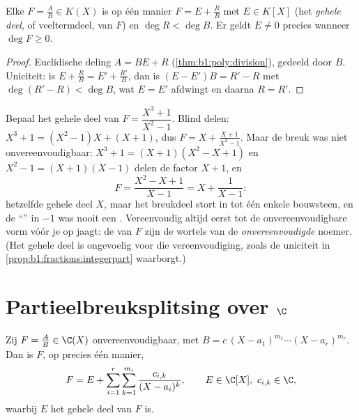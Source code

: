 \begin{proposition}\label{prop:b1:fractions:integerpart}
Elke $F = \frac AB \in K(X)$ is op één manier $F = E + \frac RB$ met $E
\in K[X]$ (het \emph{gehele deel}, of veeltermdeel, van $F$) en $\deg R <
\deg B$. Er geldt $E \neq 0$ precies wanneer $\deg F \geq 0$.
\end{proposition}

\begin{proof}
Euclidische deling $A = BE + R$ (\cref{thm:b1:poly:division}), gedeeld
door $B$. Uniciteit: is $E + \frac RB = E' + \frac{R'}{B}$, dan is $(E -
E')B = R' - R$ met $\deg(R' - R) < \deg B$, wat $E = E'$ afdwingt en
daarna $R = R'$.
\end{proof}

\begin{example}\label{ex:b1:fractions:integerpart}
Bepaal het gehele deel van $F = \dfrac{X^3 + 1}{X^2 - 1}$. Blind delen:
$X^3 + 1 = (X^2 - 1)X + (X + 1)$, dus $F = X + \frac{X + 1}{X^2 - 1}$.
Maar de breuk was niet onvereenvoudigbaar: $X^3 + 1 = (X + 1)(X^2 - X +
1)$ en $X^2 - 1 = (X+1)(X-1)$ delen de factor $X + 1$, en
\[
F = \frac{X^2 - X + 1}{X - 1} = X + \frac{1}{X - 1} :
\]
hetzelfde gehele deel $X$, maar het breukdeel stort in tot één enkele
bouwsteen, en de ``'' in $-1$ was nooit een . Vereenvoudig altijd
eerst tot de onvereenvoudigbare vorm vóór je op  jaagt: de  van
$F$ zijn de wortels van de \emph{onvereenvoudigde} noemer. (Het gehele
deel is ongevoelig voor die vereenvoudiging, zoals de uniciteit in
\cref{prop:b1:fractions:integerpart} waarborgt.)
\end{example}

\section{Partieelbreuksplitsing over $\C$}

\begin{theorem}\label{thm:b1:fractions:complex}
Zij $F = \frac AB \in \C(X)$ onvereenvoudigbaar, met $B = c\,(X -
a_1)^{m_1} \cdots (X - a_r)^{m_r}$. Dan is $F$, op precies één manier,
\[
F = E + \sum_{i=1}^{r} \sum_{k=1}^{m_i}
\frac{c_{i,k}}{(X - a_i)^k},
\qquad E \in \C[X],\ c_{i,k} \in \C ,
\]
waarbij $E$ het gehele deel van $F$ is.
\end{theorem}

